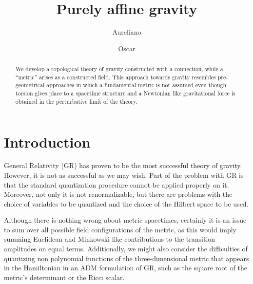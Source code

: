 \documentclass[%
  showpacs,showkeys,prd,superscriptaddress]{revtex4-1}
\begin{document}
\title{Purely affine gravity}


\author{Aureliano }

\author{Oscar }

\begin{abstract}
  We develop a topological theory of gravity constructed with a connection, while a ``metric'' arises as a constructed field. This approach towards gravity resembles pre-geometrical approaches in which a fundamental metric is not assumed even though torsion gives place to a spacetime structure and a Newtonian like gravitational force is obtained in the perturbative limit of the theory.
\end{abstract}


\maketitle

\section{Introduction}

General Relativity (GR) has proven to be the most successful theory of gravity.  However,  it is not as successful as we may wish. Part of the problem with GR is that the standard quantization procedure cannot be applied  properly on it. Moreover, not only it is not renormalizable, but there are  problems with the choice of variables to be quantized and the choice of the Hilbert space to be used. 

Although there is nothing wrong about metric spacetimes,  certainly it is an issue to sum over all possible field configurations of the metric, as this would imply summing Euclidean and Minkowski like contributions to the transition amplitudes on equal terms. Additionally, we might also consider the difficulties of  quantizing  non polynomial functions of the three-dimensional metric that appears in the Hamiltonian in an ADM formulation of GR, such as the square root of the metric's determinant or the Ricci scalar.
\end{document}
